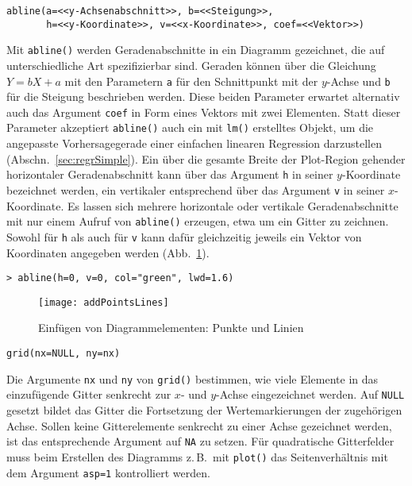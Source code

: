 \begin{lstlisting}
abline(a=<<y-Achsenabschnitt>>, b=<<Steigung>>,
       h=<<y-Koordinate>>, v=<<x-Koordinate>>, coef=<<Vektor>>)
\end{lstlisting}

Mit \lstinline!abline()! werden Geradenabschnitte in ein Diagramm gezeichnet, die auf unterschiedliche Art spezifizierbar sind. Geraden können über die Gleichung $Y = b X + a$ mit den Parametern \lstinline!a! für den Schnittpunkt mit der $y$-Achse und \lstinline!b! für die Steigung beschrieben werden. Diese beiden Parameter erwartet alternativ auch das Argument \lstinline!coef! in Form eines Vektors mit zwei Elementen. Statt dieser Parameter akzeptiert \lstinline!abline()! auch ein mit \lstinline!lm()! erstelltes Objekt, um die angepasste Vorhersagegerade einer einfachen linearen Regression darzustellen (Abschn.\ \ref{sec:regrSimple}). Ein über die gesamte Breite der Plot-Region gehender horizontaler Geradenabschnitt kann über das Argument \lstinline!h! in seiner $y$-Koordinate bezeichnet werden, ein vertikaler entsprechend über das Argument \lstinline!v! in seiner $x$-Koordinate. Es lassen sich mehrere horizontale oder vertikale Geradenabschnitte mit nur einem Aufruf von \lstinline!abline()! erzeugen, etwa um ein Gitter zu zeichnen. Sowohl für \lstinline!h! als auch für \lstinline!v! kann dafür gleichzeitig jeweils ein Vektor von Koordinaten angegeben werden (Abb.\ \ref{fig:addPointsLines}).
\begin{lstlisting}
> abline(h=0, v=0, col="green", lwd=1.6)
\end{lstlisting}

\begin{figure}[ht]
\centering
\texttt{[image: addPointsLines]}
\vspace*{-1em}
\caption{Einfügen von Diagrammelementen: Punkte und Linien}
\label{fig:addPointsLines}
\end{figure}

\begin{lstlisting}
grid(nx=NULL, ny=nx)
\end{lstlisting}

Die Argumente \lstinline!nx! und \lstinline!ny! von \lstinline!grid()! bestimmen, wie viele Elemente in das einzufügende Gitter senkrecht zur $x$- und $y$-Achse eingezeichnet werden. Auf \lstinline!NULL! gesetzt bildet das Gitter die Fortsetzung der Wertemarkierungen der zugehörigen Achse. Sollen keine Gitterelemente senkrecht zu einer Achse gezeichnet werden, ist das entsprechende Argument auf \lstinline!NA! zu setzen. Für quadratische Gitterfelder muss beim Erstellen des Diagramms z.\,B.\ mit \lstinline!plot()! das Seitenverhältnis mit dem Argument \lstinline!asp=1! kontrolliert werden.

